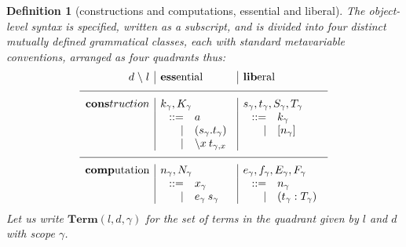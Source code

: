 \documentclass{jfp1}
\newtheorem{definition}[theorem]{Definition}
\begin{document}
\newcommand{\lib}{\textbf{lib}}
\newcommand{\ess}{\textbf{ess}}
\newcommand{\cons}{\textbf{cons}}
\newcommand{\comp}{\textbf{comp}}


\newcommand{\Tm}[3]{\mathbf{Term}(#1,#2,#3)}
\begin{definition}[constructions and computations, essential and liberal]
The object-level syntax is specified,
written as a subscript, and
is divided into four distinct mutually defined grammatical classes,
each with standard metavariable conventions,
arranged as four quadrants thus:
\[\begin{array}{r|l|l}
 d \;\backslash\; l& \ess\mbox{ential} & \lib\mbox{eral} \\
\hline
    \cons{truction} & k_\gamma, K_\gamma & s_\gamma, t_\gamma, S_\gamma, T_\gamma \\
    & \;\begin{array}[t]{rl}
          ::= & a \\
          | & (s_\gamma.t_\gamma) \\
          | & \la xt_{\gamma,x}
        \end{array}
    & \;\begin{array}[t]{rl}
          ::= & k_\gamma \\
          | & [n_\gamma]
        \end{array}
    \\
    \hline
    \comp\mbox{utation} & n_\gamma, N_\gamma & e_\gamma, f_\gamma, E_\gamma, F_\gamma \\
    & \;\begin{array}[t]{rl}
          ::= & x_\gamma \\
          | & e_\gamma\:s_\gamma 
        \end{array}
    & \;\begin{array}[t]{rl}
          ::= & n_\gamma \\
          | & (t_\gamma:T_\gamma) 
        \end{array}
    \\
  \end{array}\]
Let us write $\Tm ld\gamma$ for the set of terms in the quadrant given by $l$
and $d$ with scope $\gamma$.
\end{definition}
\end{document}
